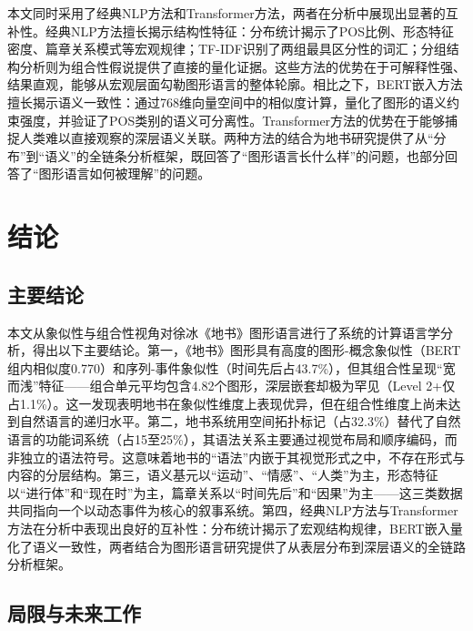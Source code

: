 \documentclass[a4paper,12pt]{article}
\begin{document}
本文同时采用了经典NLP方法和Transformer方法，两者在分析中展现出显著的互补性。经典NLP方法擅长揭示结构性特征：分布统计揭示了POS比例、形态特征密度、篇章关系模式等宏观规律；TF-IDF识别了两组最具区分性的词汇；分组结构分析则为组合性假说提供了直接的量化证据。这些方法的优势在于可解释性强、结果直观，能够从宏观层面勾勒图形语言的整体轮廓。相比之下，BERT嵌入方法擅长揭示语义一致性：通过768维向量空间中的相似度计算，量化了图形的语义约束强度，并验证了POS类别的语义可分离性。Transformer方法的优势在于能够捕捉人类难以直接观察的深层语义关联。两种方法的结合为地书研究提供了从``分布''到``语义''的全链条分析框架，既回答了``图形语言长什么样''的问题，也部分回答了``图形语言如何被理解''的问题。

\section{结论}\label{sec:conclusion}

\subsection{主要结论}

本文从象似性与组合性视角对徐冰《地书》图形语言进行了系统的计算语言学分析，得出以下主要结论。第一，《地书》图形具有高度的图形-概念象似性（BERT组内相似度0.770）和序列-事件象似性（时间先后占43.7\%），但其组合性呈现``宽而浅''特征——组合单元平均包含4.82个图形，深层嵌套却极为罕见（Level 2+仅占1.1\%）。这一发现表明地书在象似性维度上表现优异，但在组合性维度上尚未达到自然语言的递归水平。第二，地书系统用空间拓扑标记（占32.3\%）替代了自然语言的功能词系统（占15至25\%），其语法关系主要通过视觉布局和顺序编码，而非独立的语法符号。这意味着地书的``语法''内嵌于其视觉形式之中，不存在形式与内容的分层结构。第三，语义基元以``运动''、``情感''、``人类''为主，形态特征以``进行体''和``现在时''为主，篇章关系以``时间先后''和``因果''为主——这三类数据共同指向一个以动态事件为核心的叙事系统。第四，经典NLP方法与Transformer方法在分析中表现出良好的互补性：分布统计揭示了宏观结构规律，BERT嵌入量化了语义一致性，两者结合为图形语言研究提供了从表层分布到深层语义的全链路分析框架。

\subsection{局限与未来工作}
\end{document}
